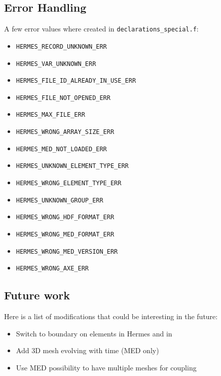 \subsection{Error Handling}
%
A few error values where created in \verb!declarations_special.f!:
\begin{itemize}
\item \verb!HERMES_RECORD_UNKNOWN_ERR!
\item \verb!HERMES_VAR_UNKNOWN_ERR!
\item \verb!HERMES_FILE_ID_ALREADY_IN_USE_ERR!
\item \verb!HERMES_FILE_NOT_OPENED_ERR!
\item \verb!HERMES_MAX_FILE_ERR!
\item \verb!HERMES_WRONG_ARRAY_SIZE_ERR!
\item \verb!HERMES_MED_NOT_LOADED_ERR!
\item \verb!HERMES_UNKNOWN_ELEMENT_TYPE_ERR!
\item \verb!HERMES_WRONG_ELEMENT_TYPE_ERR!
\item \verb!HERMES_UNKNOWN_GROUP_ERR!
\item \verb!HERMES_WRONG_HDF_FORMAT_ERR!
\item \verb!HERMES_WRONG_MED_FORMAT_ERR!
\item \verb!HERMES_WRONG_MED_VERSION_ERR!
\item \verb!HERMES_WRONG_AXE_ERR!
\end{itemize}


%
\subsection{Future work}
%
Here is a list of modifications that could be interesting in the future:
\begin{itemize}
\item Switch to boundary on elements in Hermes and in \telemacsystem
\item Add 3D mesh evolving with time (MED only)
\item Use MED possibility to have multiple meshes for coupling
\end{itemize}
